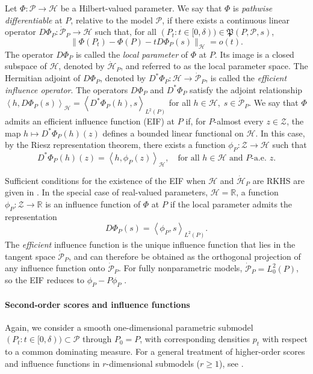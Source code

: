 \documentclass{article}
\theoremstyle{plain}
\theoremstyle{definition}
\theoremstyle{remark}
\newcommand{\R}{\mathbb{R}}
\newcommand{\cH}{\mathcal{H}}
\newcommand{\cZ}{\mathcal{Z}}
\newcommand{\cP}{\mathcal{P}}
\newcommand{\fP}{\mathfrak{P}}
\newcommand{\1}{\mathbbm{1}}
\newcommand{\iprod}[1]{\left\langle #1 \right\rangle}
\theoremstyle{plain}
\theoremstyle{definition}
\begin{document}
Let $\Phi : \cP \to \cH$ be a Hilbert-valued parameter. We say that $\Phi$ is \emph{pathwise differentiable} at $P$, relative to the model $\cP$, if there exists a continuous linear operator $D\Phi_P : \dot{\cP}_P \to \cH$ such that, for all $(P_t : t \in [0,\delta)) \in \fP(P,\cP,s)$,
\begin{equation}\label{eq:local_parameter}
\big\| \Phi(P_t) - \Phi(P) - t D\Phi_P(s) \big\|_{\cH} = o(t).
\end{equation}
The operator $D\Phi_P$ is called the \emph{local parameter} of $\Phi$ at $P$. Its image is a closed subspace of $\cH$, denoted by $\dot{\cH}_P$, and referred to as the {local parameter space}.
The Hermitian adjoint of $D\Phi_P$, denoted by $D^*\Phi_P : \cH \to \dot{\cP}_P$, is called the \emph{efficient influence operator}. The operators $D\Phi_P$ and $D^*\Phi_P$ satisfy the adjoint relationship $\iprod{h, D\Phi_P(s)}_{\cH} = \iprod{D^*\Phi_P(h), s}_{L^2(P)}$ for all $h \in \cH,\; s \in \dot{\cP}_P$.
We say that $\Phi$ admits an {efficient influence function} (EIF) at $P$ if, for $P$-almost every $z \in \cZ$, the map $h \mapsto D^*\Phi_P(h)(z)$ defines a bounded linear functional on $\cH$. In this case, by the Riesz representation theorem, there exists a function $\phi_P : \cZ \to \cH$ such that
\begin{equation}\label{eq:EIF}
D^*\Phi_P(h)(z)
=
\iprod{h, \phi_P(z)}_{\cH},
\quad
\text{for all } h \in \cH \text{ and } P\text{-a.e. } z.
\end{equation}

Sufficient conditions for the existence of the EIF when $\cH$ and $\dot{\cH}_P$ are RKHS are given in \citep[Theorem~1]{luedtke2024one}. In the special case of real-valued parameters, $\cH = \R$, a function $\phi_P : \cZ \to \R$ is an influence function of $\Phi$ at $P$ if the local parameter admits the representation 
\[
D\Phi_P(s) = \iprod{\phi_P, s}_{L^2(P)}.
\]
The \emph{efficient} influence function is the unique influence function that lies in the tangent space $\dot{\cP}_P$, and can therefore be obtained as the orthogonal projection of any influence function onto $\dot{\cP}_P$. For fully nonparametric models, $\dot{\cP}_P = L_0^2(P)$, so the EIF reduces to $\phi_P - P\phi_P$ \citep{bickel1993efficient}.


\paragraph{Second-order scores and influence functions}
Again, we consider a smooth one-dimensional parametric submodel $(P_t: t \in [0,\delta)) \subset \cP$ through $P_0 = P$, with corresponding densities $p_t$ with respect to a common dominating measure. For a general treatment of higher-order scores and influence functions in $r$-dimensional submodels ($r \geq 1$), see \citet[Sec.~2]{robins2008higher}. 
\end{document}
